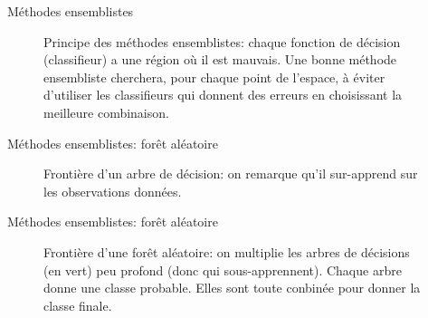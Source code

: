 \documentclass[8pt]{beamer}
\begin{document}
			\begin{frame}{Méthodes ensemblistes}
				\begin{figure}[H]
					
					\caption*{Principe des méthodes ensemblistes: chaque fonction de décision (classifieur) a une région où il est mauvais. Une bonne méthode ensembliste cherchera, pour chaque point de l'espace, à éviter d'utiliser les classifieurs qui donnent des erreurs en choisissant la meilleure combinaison.}
				\end{figure}
			\end{frame}
			\begin{frame}{Méthodes ensemblistes: forêt aléatoire}
				\begin{figure}[H]
					
					\caption*{Frontière d'un arbre de décision: on remarque qu'il sur-apprend sur les observations données.}
				\end{figure}
			\end{frame}
			\begin{frame}{Méthodes ensemblistes: forêt aléatoire}
				\begin{figure}[H]
					
					\caption*{Frontière d'une forêt aléatoire: on multiplie les arbres de décisions (en vert) peu profond (donc qui sous-apprennent). Chaque arbre donne une classe probable. Elles sont toute conbinée pour donner la classe finale.}
				\end{figure}
			\end{frame}
\end{document}
